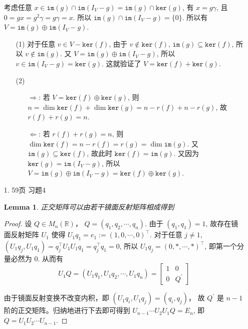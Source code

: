 \documentclass{article}
\newtheorem{lemma}[theorem]{Lemma}
\begin{document}
\begin{spacing}{1.5}
\begin{enumerate}
    考虑任意 $x\in \mathtt{im}(g) \cap\mathtt{im}(I_V - g) = \mathtt{im}(g) \cap\mathtt{ker}(g)$, 有 $x = g\gamma$, 且 $0 = gx = g^2\gamma = g\gamma = x$. 所以 $\mathtt{im}(g)\cap\mathtt{im}(I_V - g) = \{0\}$. 所以有 $V = \mathtt{im}(g) \oplus \mathtt{im}(I_V-g)$.
    \begin{itemize}
        \item [(1)] 对于任意 $v\in V - \mathtt{ker}(f)$, 由于 $v\notin \mathtt{ker}(f)$, $\mathtt{im}(g)\subseteq \mathtt{ker}(f)$, 所以 $v\notin \mathtt{im}(g)$. 又 $V = \mathtt{im}(g) \oplus \mathtt{im}(I_V - g)$, 所以 $v\in \mathtt{im}(I_V - g) = \mathtt{ker}(g)$. 这就验证了 $V = \mathtt{ker}(f) + \mathtt{ker}(g)$.
        
        \item [(2)] 
        \begin{itemize}
            \item [$\Rightarrow$:] 若 $V = \mathtt{ker}(f) \oplus \mathtt{ker}(g)$, 则 $n = \dim\mathtt{ker}(f) + \dim \mathtt{ker}(g) = n-r(f) + n - r(g)$, 故 $r(f) + r(g) = n$.
            \item [$\Leftarrow$:] 若 $r(f) + r(g) = n$, 则 $\dim\mathtt{ker}(f) = n - r(f) = r(g) = \dim\mathtt{im}(g)$. 又 $\mathtt{im}(g)\subseteq \mathtt{ker}(f)$, 故此时 $\mathtt{ker}(f) = \mathtt{im}(g)$. 又因为 $\mathtt{ker}(g) = \mathtt{im}(I_V - g)$, 所以 $V = \mathtt{im}(g) \oplus \mathtt{im}(I_V - g) = \mathtt{ker}(f) \oplus \mathtt{ker}(g)$.
        \end{itemize}
        
    \end{itemize}

    \item [1.] 59页 习题4 
    
    \begin{lemma}
        正交矩阵可以由若干镜面反射矩阵相成得到
    \end{lemma}
    \begin{proof}
        设 $Q\in M_n(\mathbb{R})$， $Q=(q_1, q_2, \cdots, q_n)$. 由于 $(q_1, q_1) = 1$, 故存在镜面反射矩阵 $U_1$ 使得 $U_1 q_1 = e_1 := (1, 0, \cdots, 0)^\top$. 对于任意 $j\ne 1$, $(U_1q_j, U_1q_1) = q_j^\top U_1U_1 q_1 = q_j^\top q_1 = 0$, 所以 $U_1q_j = (0, *, \cdots, *)^\top$, 即第一个分量必然为 $0$. 从而有 $$U_1Q = (U_1q_1, U_1q_2, \cdots, U_1q_n) = \left[\begin{array}{cc}1&0\\0&Q^\prime\end{array}\right]$$

        由于镜面反射变换不改变内积，即 $(U_1q_i, U_1q_j) = (q_i, q_j)$， 故 $Q^\prime$ 是 $n-1$ 阶的正交矩阵。归纳地进行下去即可得到 $U_{n-1}\cdots U_2U_1Q = E_n$, 即 $Q = U_1U_2\cdots U_{n-1}$.
    \end{proof}


\end{enumerate}
\end{spacing}
\end{document}
